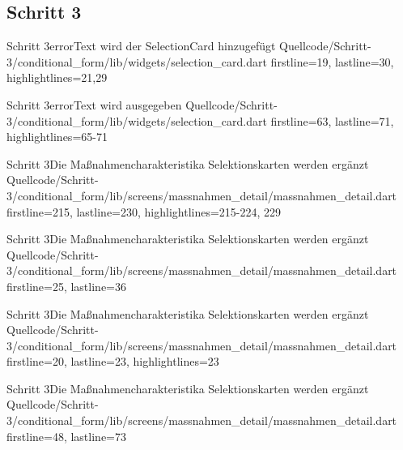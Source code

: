 \clearpage 


\subsection{Schritt 3}

\begin{alexlisting}{Schritt 3}{errorText wird der SelectionCard hinzugefügt}
    {Quellcode/Schritt-3/conditional_form/lib/widgets/selection_card.dart}
    {firstline=19, lastline=30, highlightlines={21,29}}
    \label{lst:Schritt3DieMassnahmencharakteristikaSelektionskartenWerdenergaenzt}
\end{alexlisting}

\begin{alexlisting}{Schritt 3}{errorText wird ausgegeben}
    {Quellcode/Schritt-3/conditional_form/lib/widgets/selection_card.dart}
    {firstline=63, lastline=71, highlightlines={65-71}}
    \label{lst:Schritt3DieMassnahmencharakteristikaSelektionskartenWerdenergaenzt}
\end{alexlisting}

\begin{alexlisting}{Schritt 3}{Die Maßnahmencharakteristika Selektionskarten werden ergänzt}
    {Quellcode/Schritt-3/conditional_form/lib/screens/massnahmen_detail/massnahmen_detail.dart}
    {firstline=215, lastline=230, highlightlines={215-224, 229}}
    \label{lst:Schritt3DieMassnahmencharakteristikaSelektionskartenWerdenergaenzt}
\end{alexlisting}

\begin{alexlisting}{Schritt 3}{Die Maßnahmencharakteristika Selektionskarten werden ergänzt}
    {Quellcode/Schritt-3/conditional_form/lib/screens/massnahmen_detail/massnahmen_detail.dart}
    {firstline=25, lastline=36}
    \label{lst:Schritt3DieMassnahmencharakteristikaSelektionskartenWerdenergaenzt}
\end{alexlisting}

\begin{alexlisting}{Schritt 3}{Die Maßnahmencharakteristika Selektionskarten werden ergänzt}
    {Quellcode/Schritt-3/conditional_form/lib/screens/massnahmen_detail/massnahmen_detail.dart}
    {firstline=20, lastline=23, highlightlines={23}}
    \label{lst:Schritt3DieMassnahmencharakteristikaSelektionskartenWerdenergaenzt}
\end{alexlisting}


\begin{alexlisting}{Schritt 3}{Die Maßnahmencharakteristika Selektionskarten werden ergänzt}
    {Quellcode/Schritt-3/conditional_form/lib/screens/massnahmen_detail/massnahmen_detail.dart}
    {firstline=48, lastline=73}
    \label{lst:Schritt3DieMassnahmencharakteristikaSelektionskartenWerdenergaenzt}
\end{alexlisting}


